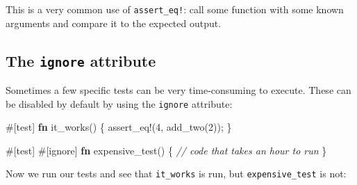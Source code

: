 \documentclass[a4paper,]{book}
\newenvironment{Shaded}{\begin{snugshade}}{\end{snugshade}}
\newcommand{\KeywordTok}[1]{\textcolor[rgb]{0.13,0.29,0.53}{\textbf{{#1}}}}
\newcommand{\DecValTok}[1]{\textcolor[rgb]{0.00,0.00,0.81}{{#1}}}
\newcommand{\CommentTok}[1]{\textcolor[rgb]{0.56,0.35,0.01}{\textit{{#1}}}}
\newcommand{\OtherTok}[1]{\textcolor[rgb]{0.56,0.35,0.01}{{#1}}}
\newcommand{\NormalTok}[1]{{#1}}
\begin{document}
This is a very common use of \texttt{assert\_eq!}: call some function
with some known arguments and compare it to the expected output.

\subsection{\texorpdfstring{The \texttt{ignore}
attribute}{The ignore attribute}}\label{the-ignore-attribute}

Sometimes a few specific tests can be very time-consuming to execute.
These can be disabled by default by using the \texttt{ignore} attribute:

\begin{Shaded}
\begin{Highlighting}[]
\OtherTok{#[}\NormalTok{test}\OtherTok{]}
\KeywordTok{fn} \NormalTok{it_works() \{}
    \OtherTok{assert_eq!}\NormalTok{(}\DecValTok{4}\NormalTok{, add_two(}\DecValTok{2}\NormalTok{));}
\NormalTok{\}}

\OtherTok{#[}\NormalTok{test}\OtherTok{]}
\OtherTok{#[}\NormalTok{ignore}\OtherTok{]}
\KeywordTok{fn} \NormalTok{expensive_test() \{}
    \CommentTok{// code that takes an hour to run}
\NormalTok{\}}
\end{Highlighting}
\end{Shaded}

Now we run our tests and see that \texttt{it\_works} is run, but
\texttt{expensive\_test} is not:

\begin{Shaded}
\end{Shaded}
\end{document}

